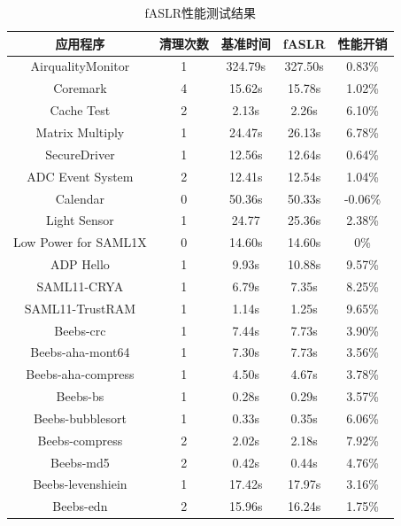 \documentclass[UTF8,12pt,a4paper]{ctexart}
\numberwithin{figure}{section}
\begin{document}
\begin{longtable}{ccccc}
    \caption{fASLR性能测试结果}  %
    \label{table1}                                            \\ %
    \hline
    应用程序                 & 清理次数 & 基准时间    & fASLR   & 性能开销    \\ \hline
    AirqualityMonitor    & 1    & 324.79s & 327.50s & 0.83\%  \\ 
    Coremark             & 4    & 15.62s  & 15.78s  & 1.02\%  \\ 
    Cache Test           & 2    & 2.13s   & 2.26s   & 6.10\%  \\ 
    Matrix Multiply      & 1    & 24.47s  & 26.13s  & 6.78\%  \\ 
    SecureDriver         & 1    & 12.56s  & 12.64s  & 0.64\%  \\ 
    ADC Event System     & 2    & 12.41s  & 12.54s  & 1.04\%  \\ 
    Calendar             & 0    & 50.36s  & 50.33s  & -0.06\% \\ 
    Light Sensor         & 1    & 24.77   & 25.36s  & 2.38\%  \\ 
    Low Power for SAML1X & 0    & 14.60s  & 14.60s  & 0\%     \\ 
    ADP Hello            & 1    & 9.93s   & 10.88s  & 9.57\%  \\ 
    SAML11-CRYA          & 1    & 6.79s   & 7.35s   & 8.25\%  \\ 
    SAML11-TrustRAM      & 1    & 1.14s   & 1.25s   & 9.65\%  \\ 
    Beebs-crc            & 1    & 7.44s   & 7.73s   & 3.90\%  \\ 
    Beebs-aha-mont64     & 1    & 7.30s   & 7.73s   & 3.56\%  \\ 
    Beebs-aha-compress   & 1    & 4.50s   & 4.67s   & 3.78\%  \\ 
    Beebs-bs             & 1    & 0.28s   & 0.29s   & 3.57\%  \\ 
    Beebs-bubblesort     & 1    & 0.33s   & 0.35s   & 6.06\%  \\ 
    Beebs-compress       & 2    & 2.02s   & 2.18s   & 7.92\%  \\ 
    Beebs-md5            & 2    & 0.42s   & 0.44s   & 4.76\%  \\ 
    Beebs-levenshiein    & 1    & 17.42s  & 17.97s  & 3.16\%  \\ 
    Beebs-edn            & 2    & 15.96s  & 16.24s  & 1.75\%  \\ \hline
\end{longtable}
\end{document}
